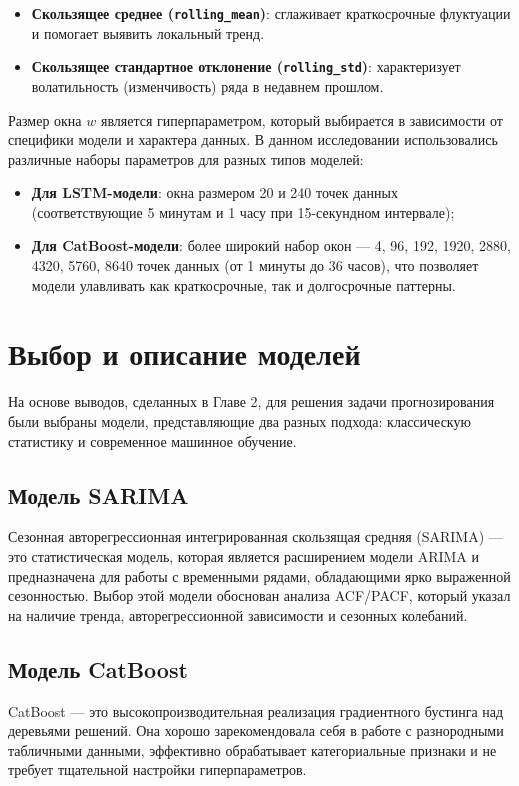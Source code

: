 \begin{itemize}
	\item \textbf{Скользящее среднее (\texttt{rolling\_mean})}: сглаживает краткосрочные флуктуации и помогает выявить локальный тренд.
	\item \textbf{Скользящее стандартное отклонение (\texttt{rolling\_std})}: характеризует волатильность (изменчивость) ряда в недавнем прошлом.
\end{itemize}
Размер окна $w$ является гиперпараметром, который выбирается в зависимости от специфики модели и характера данных. В данном исследовании использовались различные наборы параметров для разных типов моделей:

\begin{itemize}
	\item \textbf{Для LSTM-модели}: окна размером 20 и 240 точек данных (соответствующие 5 минутам и 1 часу при 15-секундном интервале);
	\item \textbf{Для CatBoost-модели}: более широкий набор окон --- 4, 96, 192, 1920, 2880, 4320, 5760, 8640 точек данных (от 1 минуты до 36 часов), что позволяет модели улавливать как краткосрочные, так и долгосрочные паттерны.
\end{itemize}

\section{Выбор и описание моделей}
\label{sec:model_selection}

\hspace*{1.25cm}На основе выводов, сделанных в Главе 2, для решения задачи прогнозирования были выбраны модели, представляющие два разных подхода: классическую статистику и современное машинное обучение.

\subsection{Модель SARIMA}
\hspace*{1.25cm}Сезонная авторегрессионная интегрированная скользящая средняя (SARIMA) — это статистическая модель, которая является расширением модели ARIMA и предназначена для работы с временными рядами, обладающими ярко выраженной сезонностью. Выбор этой модели обоснован анализа ACF/PACF, который указал на наличие тренда, авторегрессионной зависимости и сезонных колебаний.

\subsection{Модель CatBoost}
\hspace*{1.25cm}CatBoost — это высокопроизводительная реализация градиентного бустинга над деревьями решений. Она хорошо зарекомендовала себя в работе с разнородными табличными данными, эффективно обрабатывает категориальные признаки и не требует тщательной настройки гиперпараметров.

